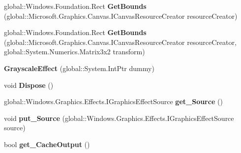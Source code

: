 \begin{DoxyCompactItemize}
global\+::\+Windows.\+Foundation.\+Rect {\bfseries Get\+Bounds} (global\+::\+Microsoft.\+Graphics.\+Canvas.\+I\+Canvas\+Resource\+Creator resource\+Creator)
\item 
\mbox{\label{class_microsoft_1_1_graphics_1_1_canvas_1_1_effects_1_1_grayscale_effect_a1d303822b3c4206b73165e84e42e55cd}} 
global\+::\+Windows.\+Foundation.\+Rect {\bfseries Get\+Bounds} (global\+::\+Microsoft.\+Graphics.\+Canvas.\+I\+Canvas\+Resource\+Creator resource\+Creator, global\+::\+System.\+Numerics.\+Matrix3x2 transform)
\item 
\mbox{\label{class_microsoft_1_1_graphics_1_1_canvas_1_1_effects_1_1_grayscale_effect_a015472d5b20c0e171a411c27f64edc01}} 
{\bfseries Grayscale\+Effect} (global\+::\+System.\+Int\+Ptr dummy)
\item 
\mbox{\label{class_microsoft_1_1_graphics_1_1_canvas_1_1_effects_1_1_grayscale_effect_a7372dc109bbbb885617e2d79209b7c87}} 
void {\bfseries Dispose} ()
\item 
\mbox{\label{class_microsoft_1_1_graphics_1_1_canvas_1_1_effects_1_1_grayscale_effect_a2e2ee157a9b4c692f2f71f46fd3aa570}} 
global\+::\+Windows.\+Graphics.\+Effects.\+I\+Graphics\+Effect\+Source {\bfseries get\+\_\+\+Source} ()
\item 
\mbox{\label{class_microsoft_1_1_graphics_1_1_canvas_1_1_effects_1_1_grayscale_effect_aacc2139785cbbe136738db75ab05743c}} 
void {\bfseries put\+\_\+\+Source} (global\+::\+Windows.\+Graphics.\+Effects.\+I\+Graphics\+Effect\+Source source)
\item 
\mbox{\label{class_microsoft_1_1_graphics_1_1_canvas_1_1_effects_1_1_grayscale_effect_ad9db44f761fc7f92ebfa79cf4579cc69}} 
bool {\bfseries get\+\_\+\+Cache\+Output} ()
\item 
\mbox{\label{class_microsoft_1_1_graphics_1_1_canvas_1_1_effects_1_1_grayscale_effect_abb26ffcaefa0d98038ddcfbb61fd7fcc}} 

\end{DoxyCompactItemize}
